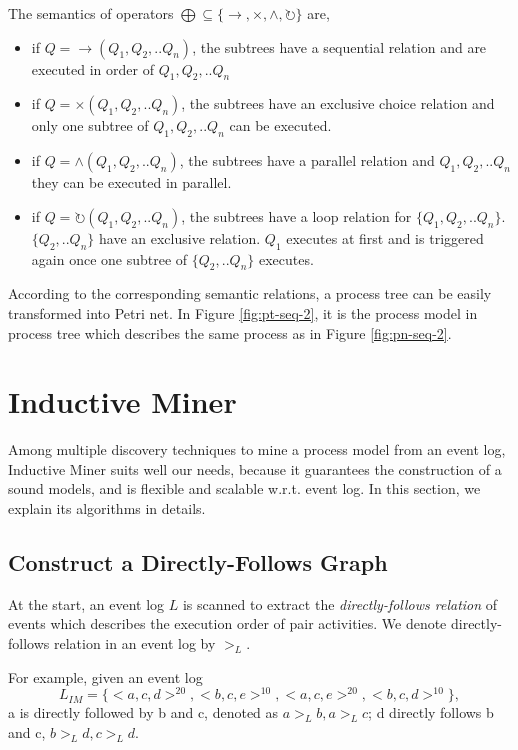 \begin{definition} 
	The semantics of operators $\bigoplus \subseteq \{\rightarrow, \times, \land, \circlearrowright \}$ are,
	\begin{itemize}
		\item if $Q= \rightarrow(Q_1 , Q_2 ,.. Q_n)$, the subtrees have a sequential relation and are executed in order of $Q_1,Q_2,..Q_n$
		\item if $Q= \times(Q_1 , Q_2 ,.. Q_n)$,  the subtrees have an exclusive choice relation and only one subtree of $Q_1,Q_2,..Q_n$   can be executed.
		\item if $Q= \land (Q_1 , Q_2 ,.. Q_n)$,  the subtrees have a parallel relation and $Q_1,Q_2,..Q_n$ they can be executed in parallel.
		\item if $Q= \circlearrowright(Q_1 , Q_2 ,.. Q_n)$,  the subtrees have a loop relation for $\{Q_1,Q_2,..Q_n\}$. $\{Q_2,..Q_n\}$ have an exclusive relation. $Q_1$ executes at first and is triggered again once one subtree of $\{Q_2,..Q_n\}$ executes.
	\end{itemize}
\end{definition}
According to the corresponding semantic relations,  a process tree can be easily transformed into Petri net. In Figure \ref{fig:pt-seq-2}, it is the process model in process tree which describes the same process as in Figure \ref{fig:pn-seq-2}. 
\section{Inductive Miner}
Among multiple discovery techniques to mine a process model from an event log, Inductive Miner suits well our needs, because it guarantees the construction of a sound models, and is flexible and scalable w.r.t. event log. In this section, we explain its algorithms in details.
\subsection{Construct a Directly-Follows Graph}
At the start, an event log $L$ is scanned to extract the \emph{directly-follows relation} of events which describes the execution order of pair activities. We denote directly-follows relation in an event log by $>_L$. 
  
For example, given an event log \[L_{IM}=\{<a,c,d>^{20},<b,c,e>^{10},<a,c,e>^{20},<b,c,d>^{10}\},\] 
a is directly followed by b and c, denoted as $a >_L b, a>_L c$; d directly follows b and c, $b>_L d, c>_L d$.

